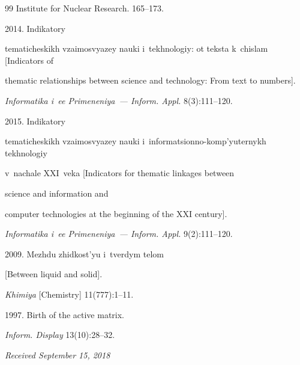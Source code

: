 {{\begin{thebibliography}{99}
Institute for Nuclear Research. 165--173.






2014. Indikatory 


tematicheskikh vzaimosvyazey nauki i~tekhnologiy: ot teksta k~chislam [Indicators of 


thematic relationships between science and technology: From text to numbers]. 


\textit{Informatika i~ee Primeneniya~--- Inform. Appl.} 8(3):111--120.






2015. Indikatory 


tematicheskikh vzaimosvyazey nauki i~informatsionno-komp'yuternykh tekhnologiy 


v~nachale XXI~veka [Indicators for thematic linkages between 


science and information and 


computer technologies at the beginning of the XXI century]. 


\textit{Informatika i~ee Primeneniya~--- Inform. Appl.} 9(2):111--120.




 2009. {Mezhdu zhidkost'yu i~tverdym telom} 


[Between liquid and solid]. 


\textit{Khimiya} [Chemistry] 11(777):1--11.




 1997. Birth of the active matrix. 


\textit{Inform. Display} 13(10):28--32.


\end{thebibliography}


} }








\vspace*{-3pt}





\hfill{\small\textit{Received September 15, 2018}} 


